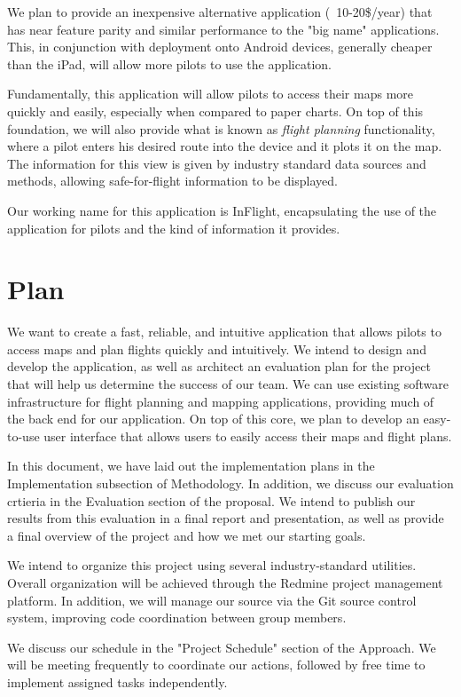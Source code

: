 \documentclass[10pt,a4paper]{article}
\begin{document}
We plan to provide an inexpensive alternative application (~10-20\$/year) that has near feature parity and similar performance to the "big name" applications. This, in conjunction with deployment onto Android devices, generally cheaper than the iPad, will allow more pilots to use the application.

Fundamentally, this application will allow pilots to access their maps more quickly and easily, especially when compared to paper charts. On top of this foundation, we will also provide what is known as \emph{flight planning} functionality, where a pilot enters his desired route into the device and it plots it on the map. The information for this view is given by industry standard data sources and methods, allowing safe-for-flight information to be displayed.

Our working name for this application is InFlight, encapsulating the use of the application for pilots and the kind of information it provides.
\section{Plan}
We want to create a fast, reliable, and intuitive application that allows pilots to access maps and plan flights quickly and intuitively. We intend to design and develop the application, as well as architect an evaluation plan for the project that will help us determine the success of our team. We can use existing software infrastructure for flight planning and mapping applications, providing much of the back end for our application. On top of this core, we plan to develop an easy-to-use user interface that allows users to easily access their maps and flight plans. 

In this document, we have laid out the implementation plans in the Implementation subsection of Methodology. In addition, we discuss our evaluation crtieria in the Evaluation section of the proposal. We intend to publish our results from this evaluation in a final report and presentation, as well as provide a final overview of the project and how we met our starting goals.

We intend to organize this project using several industry-standard utilities. Overall organization will be achieved through the Redmine project management platform. In addition, we will manage our source via the Git source control system, improving code coordination between group members. 

We discuss our schedule in the "Project Schedule" section of the Approach. We will be meeting frequently to coordinate our actions, followed by free time to implement assigned tasks independently.
\end{document}
